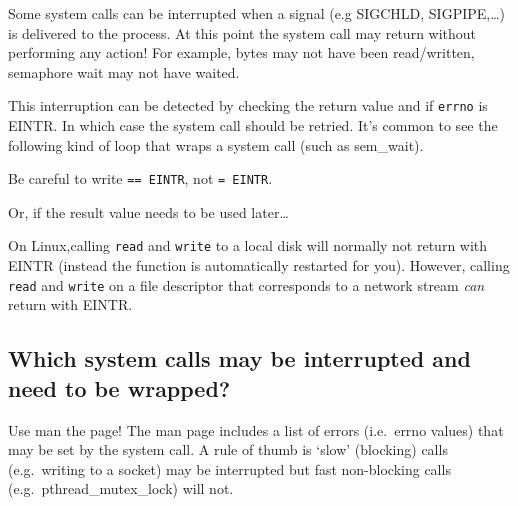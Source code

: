 Some system calls can be interrupted when a signal (e.g SIGCHLD,
SIGPIPE,\ldots{}) is delivered to the process. At this point the system
call may return without performing any action! For example, bytes may
not have been read/written, semaphore wait may not have waited.

This interruption can be detected by checking the return value and if
\texttt{errno} is EINTR. In which case the system call should be
retried. It's common to see the following kind of loop that wraps a
system call (such as sem\_wait).

\begin{Shaded}
\begin{Highlighting}[]
 \NormalTok{((-} \NormalTok{\}}
\end{Highlighting}
\end{Shaded}

Be careful to write \texttt{==\ EINTR}, not \texttt{=\ EINTR}.

Or, if the result value needs to be used later\ldots{}

\begin{Shaded}
\begin{Highlighting}[]
 \NormalTok{((-} \NormalTok{\}}
\end{Highlighting}
\end{Shaded}

On Linux,calling \texttt{read} and \texttt{write} to a local disk will
normally not return with EINTR (instead the function is automatically
restarted for you). However, calling \texttt{read} and \texttt{write} on
a file descriptor that corresponds to a network stream \emph{can} return
with EINTR.

\subsection{Which system calls may be interrupted and need to be
wrapped?}\label{which-system-calls-may-be-interrupted-and-need-to-be-wrapped}

Use man the page! The man page includes a list of errors (i.e.~errno
values) that may be set by the system call. A rule of thumb is `slow'
(blocking) calls (e.g.~writing to a socket) may be interrupted but fast
non-blocking calls (e.g.~pthread\_mutex\_lock) will not.

